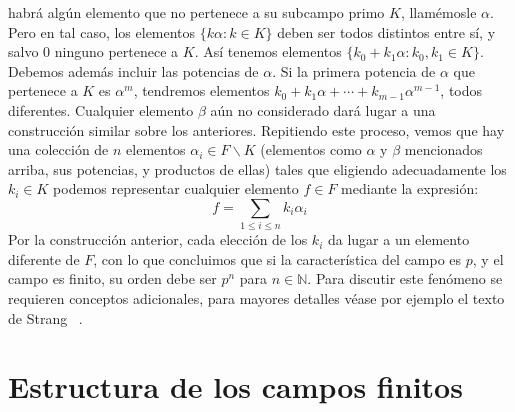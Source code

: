   habrá algún elemento que no pertenece a su subcampo primo \(K\),
  llamémosle \(\alpha\).
  Pero en tal caso,
  los elementos \(\{k \alpha \colon k \in K\}\)
  deben ser todos distintos entre sí,
  y salvo \(0\) ninguno pertenece a \(K\).
  Así tenemos elementos
    \(\{k_0 + k_1 \alpha \colon k_0, k_1 \in K\}\).
  Debemos además incluir las potencias de \(\alpha\).
  Si la primera potencia de \(\alpha\)
  que pertenece a \(K\) es \(\alpha^m\),
  tendremos elementos
    \(k_0 + k_1 \alpha + \dotsb + k_{m - 1} \alpha^{m - 1}\),
  todos diferentes.
  Cualquier elemento \(\beta\) aún no considerado
  dará lugar a una construcción similar sobre los anteriores.
  Repitiendo este proceso,
  vemos que hay
  una colección de \(n\) elementos
    \(\alpha_i \in F \smallsetminus K\)
  (elementos como \(\alpha\) y \(\beta\) mencionados arriba,
   sus potencias,
   y productos de ellas)
  tales que eligiendo adecuadamente los \(k_i \in K\)
  podemos representar cualquier elemento \(f \in F\)
  mediante la expresión:
  \begin{equation*}
    f
      = \sum_{1 \le i \le n} k_i \alpha_i
  \end{equation*}
  Por la construcción anterior,
  cada elección de los \(k_i\)
  da lugar a un elemento diferente de \(F\),
  con lo que concluimos que si la característica del campo es \(p\),
  y el campo es finito,
  su orden debe ser \(p^n\) para \(n \in \mathbb{N}\).
  Para discutir este fenómeno se requieren conceptos adicionales,
  para mayores detalles véase por ejemplo el texto de Strang~%
    \cite{strang09:_intr_linear_algebra}.



\section{Estructura de los campos finitos}
\label{sec:estructura-campos-finitos}

